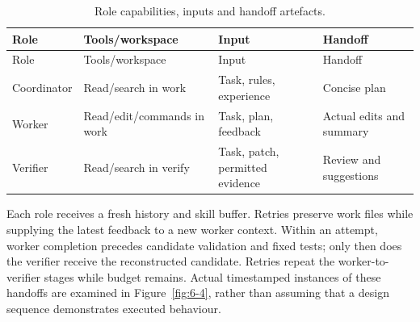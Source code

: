
\begin{longtable}[]{@{}
  >{\raggedright\arraybackslash}p{}
  >{\raggedright\arraybackslash}p{}
  >{\raggedright\arraybackslash}p{}
  >{\raggedright\arraybackslash}p{}@{}}
\caption[Role contracts]{Role capabilities, inputs and handoff artefacts.}\label{tab:4-2}\tabularnewline
\toprule\noalign{}
\begin{minipage}[b]{\linewidth}\raggedright
Role
\end{minipage} & \begin{minipage}[b]{\linewidth}\raggedright
Tools/workspace
\end{minipage} & \begin{minipage}[b]{\linewidth}\raggedright
Input
\end{minipage} & \begin{minipage}[b]{\linewidth}\raggedright
Handoff
\end{minipage} \\
\midrule\noalign{}
\endfirsthead
\toprule\noalign{}
\begin{minipage}[b]{\linewidth}\raggedright
Role
\end{minipage} & \begin{minipage}[b]{\linewidth}\raggedright
Tools/workspace
\end{minipage} & \begin{minipage}[b]{\linewidth}\raggedright
Input
\end{minipage} & \begin{minipage}[b]{\linewidth}\raggedright
Handoff
\end{minipage} \\
\midrule\noalign{}
\endhead
\bottomrule\noalign{}
\endlastfoot
Coordinator & Read/search in work & Task, rules, experience & Concise plan \\
Worker & Read/edit/commands in work & Task, plan, feedback & Actual edits and summary \\
Verifier & Read/search in verify & Task, patch, permitted evidence & Review and suggestions \\
\end{longtable}

Each role receives a fresh history and skill buffer. Retries preserve work files while supplying the latest feedback to a new worker context. Within an attempt, worker completion precedes candidate validation and fixed tests; only then does the verifier receive the reconstructed candidate. Retries repeat the worker-to-verifier stages while budget remains. Actual timestamped instances of these handoffs are examined in Figure~\ref{fig:6-4}, rather than assuming that a design sequence demonstrates executed behaviour.

